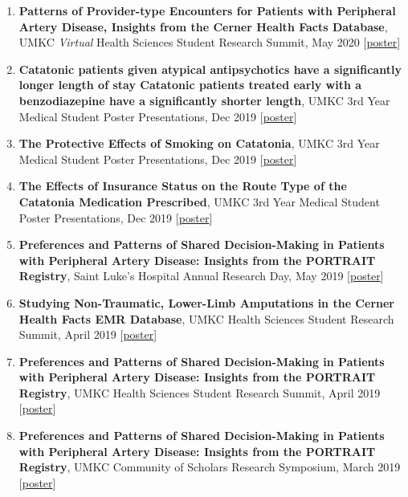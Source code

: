 \documentclass[
]{article}
\begin{document}
\begin{enumerate}
\def\labelenumi{\arabic{enumi}.}
\item
  \textbf{Patterns of Provider-type Encounters for Patients with
  Peripheral Artery Disease, Insights from the Cerner Health Facts
  Database}, UMKC \emph{Virtual} Health Sciences Student Research
  Summit, May 2020
  {[}\href{https://jeremyprovance.github.io/assets/2020_HSSRS_poster.pdf}{poster}{]}
\item
  \textbf{Catatonic patients given atypical antipsychotics have a
  significantly longer length of stay Catatonic patients treated early
  with a benzodiazepine have a significantly shorter length}, UMKC 3rd
  Year Medical Student Poster Presentations, Dec 2019
  {[}\href{https://jeremyprovance.github.io/assets/Group_12_Poster.pdf}{poster}{]}
\item
  \textbf{The Protective Effects of Smoking on Catatonia}, UMKC 3rd Year
  Medical Student Poster Presentations, Dec 2019
  {[}\href{https://jeremyprovance.github.io/assets/Group_13_Poster.pdf}{poster}{]}
\item
  \textbf{The Effects of Insurance Status on the Route Type of the
  Catatonia Medication Prescribed}, UMKC 3rd Year Medical Student Poster
  Presentations, Dec 2019
  {[}\href{https://jeremyprovance.github.io/assets/Group_14_Poster.pdf}{poster}{]}
\item
  \textbf{Preferences and Patterns of Shared Decision-Making in Patients
  with Peripheral Artery Disease: Insights from the PORTRAIT Registry},
  Saint Luke's Hospital Annual Research Day, May 2019
  {[}\href{https://jeremyprovance.github.io/assets/2019-03-16_Poster.pdf}{poster}{]}
\item
  \textbf{Studying Non-Traumatic, Lower-Limb Amputations in the Cerner
  Health Facts EMR Database}, UMKC Health Sciences Student Research
  Summit, April 2019
  {[}\href{https://jeremyprovance.github.io/assets/2019-04-17_Poster.pdf}{poster}{]}
\item
  \textbf{Preferences and Patterns of Shared Decision-Making in Patients
  with Peripheral Artery Disease: Insights from the PORTRAIT Registry},
  UMKC Health Sciences Student Research Summit, April 2019
  {[}\href{https://jeremyprovance.github.io/assets/2019-03-16_Poster.pdf}{poster}{]}
\item
  \textbf{Preferences and Patterns of Shared Decision-Making in Patients
  with Peripheral Artery Disease: Insights from the PORTRAIT Registry},
  UMKC Community of Scholars Research Symposium, March 2019
  {[}\href{https://jeremyprovance.github.io/assets/2019-03-16_Poster.pdf}{poster}{]}

\end{enumerate}
\end{document}
